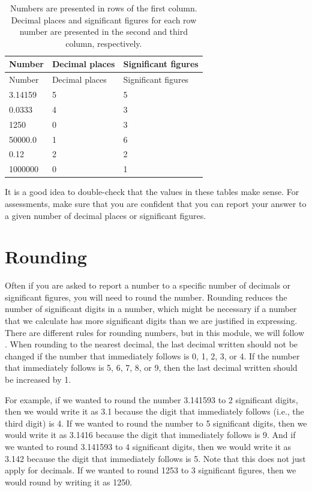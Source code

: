 \documentclass[
]{scrbook}
\begin{document}
\begin{longtable}[]{@{}lll@{}}
\caption{Numbers are presented in rows of the first column. Decimal places and significant figures for each row number are presented in the second and third column, respectively.}\tabularnewline
\toprule
Number & Decimal places & Significant figures \\
\midrule
\endfirsthead
\toprule
Number & Decimal places & Significant figures \\
\midrule
\endhead
3.14159 & 5 & 5 \\
0.0333 & 4 & 3 \\
1250 & 0 & 3 \\
50000.0 & 1 & 6 \\
0.12 & 2 & 2 \\
1000000 & 0 & 1 \\
\bottomrule
\end{longtable}

It is a good idea to double-check that the values in these tables make sense.
For assessments, make sure that you are confident that you can report your answer to a given number of decimal places or significant figures.

\hypertarget{rounding}{%
\section{Rounding}\label{rounding}}

Often if you are asked to report a number to a specific number of decimals or significant figures, you will need to round the number.
Rounding reduces the number of significant digits in a number, which might be necessary if a number that we calculate has more significant digits than we are justified in expressing.
There are different rules for rounding numbers, but in this module, we will follow \citet{Sokal1995}.
When rounding to the nearest decimal, the last decimal written should not be changed if the number that immediately follows is 0, 1, 2, 3, or 4.
If the number that immediately follows is 5, 6, 7, 8, or 9, then the last decimal written should be increased by 1.

For example, if we wanted to round the number 3.141593 to 2 significant digits, then we would write it as 3.1 because the digit that immediately follows (i.e., the third digit) is 4.
If we wanted to round the number to 5 significant digits, then we would write it as 3.1416 because the digit that immediately follows is 9.
And if we wanted to round 3.141593 to 4 significant digits, then we would write it as 3.142 because the digit that immediately follows is 5.
Note that this does not just apply for decimals.
If we wanted to round 1253 to 3 significant figures, then we would round by writing it as 1250.
\end{document}
